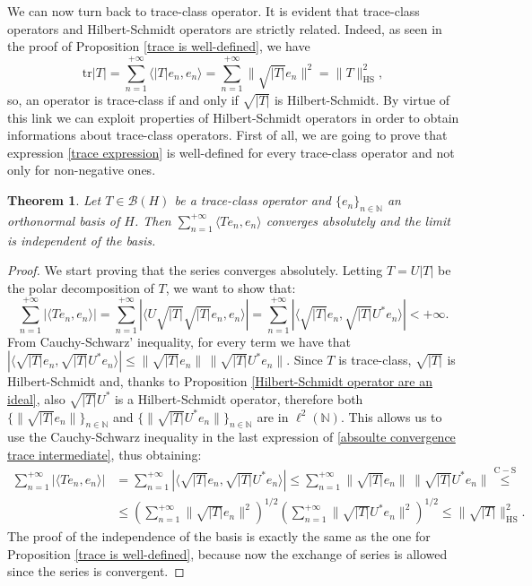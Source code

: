 \documentclass[corpo=11pt, stile=classica, tipotesi=custom,
greek, evenboxes, english]{toptesi}
\numberwithin{equation}{chapter}
\newtheorem{teo}{Theorem}[chapter] %
\theoremstyle{remark}
\newcommand{\N}{\mathbb{N}} %
\newcommand{\B}{\mathscr{B}} %
\begin{document}
We can now turn back to trace-class operator. It is evident that trace-class operators and Hilbert-Schmidt operators are strictly related. Indeed, as seen in the proof of Proposition \ref{trace is well-defined}, we have
\begin{equation*}
	\mathrm{tr}|T| = \sum_{n=1}^{+\infty} \langle |T|e_n, e_n \rangle = \sum_{n=1}^{+\infty} \|\sqrt{|T|}e_n\|^2 = \| T \|_{\mathrm{HS}}^2,
\end{equation*}
so, an operator is trace-class if and only if $\sqrt{|T|}$ is Hilbert-Schmidt. By virtue of this link we can exploit properties of Hilbert-Schmidt operators in order to obtain informations about trace-class operators. First of all, we are going to prove that expression \eqref{trace expression} is well-defined for every trace-class operator and not only for non-negative ones.
\begin{teo}
	Let $T \in \B(H)$ be a trace-class operator and $\{e_n\}_{n \in \N}$ an orthonormal basis of $H$. Then $\sum_{n=1}^{+\infty} \langle Te_n,e_n \rangle$ converges absolutely and the limit is independent of the basis.
\end{teo}
\begin{proof}
	We start proving that the series converges absolutely. Letting $T = U |T|$ be the polar decomposition of $T$, we want to show that:
	\begin{equation}\label{absoulte convergence trace intermediate}
		\sum_{n=1}^{+\infty} |\langle Te_n,e_n  \rangle| = \sum_{n=1}^{+\infty} |\langle U\sqrt{|T|}\sqrt{|T|}e_n,e_n \rangle| = \sum_{n=1}^{+\infty} |\langle \sqrt{|T|}e_n,\sqrt{|T|}U^*e_n\rangle| < +\infty.
	\end{equation}
	From Cauchy-Schwarz' inequality, for every term we have that $|\langle \sqrt{|T|}e_n,\sqrt{|T|}U^*e_n\rangle| \leq \|\sqrt{|T|}e_n \|\,\| \sqrt{|T|}U^*e_n\|$.
	Since $T$ is trace-class, $\sqrt{|T|}$ is Hilbert-Schmidt and, thanks to Proposition \ref{Hilbert-Schmidt operator are an ideal}, also $\sqrt{|T|}U^*$ is a Hilbert-Schmidt operator, therefore both $\{\|\sqrt{|T|}e_n\|\}_{n \in \N}$ and $\{\|\sqrt{|T|}U^* e_n\|\}_{n \in \N}$ are in $\ell^2(\N)$. This allows us to use the Cauchy-Schwarz inequality in the last expression of \eqref{absoulte convergence trace intermediate}, thus obtaining:
	\begin{align*}
		\sum_{n=1}^{+\infty} |\langle Te_n,e_n  \rangle| &= \sum_{n=1}^{+\infty} |\langle \sqrt{|T|}e_n,\sqrt{|T|}U^*e_n\rangle| \leq \sum_{n=1}^{+\infty} \| \sqrt{|T|}e_n\|\, \|\sqrt{|T|}U^*e_n \| \overset{\mathrm{C-S}}{\leq}\\
		&\leq \left(\sum_{n=1}^{+\infty} \| \sqrt{|T|}e_n\|^2 \right)^{1/2} \left(\sum_{n=1}^{+\infty} \| \sqrt{|T|}U^*e_n\|^2 \right)^{1/2} \leq \|\sqrt{|T|}\|_{\mathrm{HS}}^2.
	\end{align*}
	The proof of the independence of the basis is exactly the same as the one for Proposition \ref{trace is well-defined}, because now the exchange of series is allowed since the series is convergent.
\end{proof}
\end{document}
